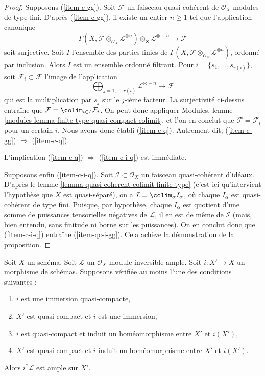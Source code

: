 \begin{proof}
\medskip\noindent
Supposons (\ref{item-c-gg}). Soit $\mathcal{F}$ un faisceau
quasi-cohérent de $\mathcal{O}_X$-modules de type fini.
D'après (\ref{item-c-gg}), il existe un entier $n \geq 1$ tel que
l'application canonique
$$
\Gamma(X, \mathcal{F} \otimes_{\mathcal{O}_X} \mathcal{L}^{\otimes n})
\otimes_{\mathbf{Z}} \mathcal{L}^{\otimes -n}
\longrightarrow
\mathcal{F}
$$
soit surjective. Soit $I$ l'ensemble des parties finies de
$\Gamma(X, \mathcal{F} \otimes_{\mathcal{O}_X} \mathcal{L}^{\otimes n})$,
ordonné par inclusion. Alors $I$ est un ensemble ordonné filtrant.
Pour $i = \{s_1, \ldots, s_{r(i)}\}$, soit $\mathcal{F}_i \subset \mathcal{F}$
l'image de l'application
$$
\bigoplus\nolimits_{j = 1, \ldots, r(i)} \mathcal{L}^{\otimes -n}
\longrightarrow
\mathcal{F}
$$
qui est la multiplication par $s_j$ sur le $j$-ième facteur. La surjectivité
ci-dessus entraîne que $\mathcal{F} = \colim_{i \in I} \mathcal{F}_i$.
On peut donc appliquer Modules, lemme \ref{modules-lemma-finite-type-quasi-compact-colimit},
et l'on en conclut que
$\mathcal{F} = \mathcal{F}_i$ pour un certain $i$.
Nous avons donc établi (\ref{item-c-q}). Autrement dit,
(\ref{item-c-gg}) $\Rightarrow$ (\ref{item-c-q}).

\medskip\noindent
L'implication (\ref{item-c-q}) $\Rightarrow$ (\ref{item-c-i-q}) est immédiate.

\medskip\noindent
Supposons enfin (\ref{item-c-i-q}).
Soit $\mathcal{I} \subset \mathcal{O}_X$ un faisceau quasi-cohérent
d'idéaux. D'après le lemme \ref{lemma-quasi-coherent-colimit-finite-type}
(c'est ici qu'intervient l'hypothèse que $X$ est
quasi-séparé), on a $\mathcal{I} = \colim_\alpha I_\alpha$, où
chaque $I_\alpha$ est quasi-cohérent de type fini. Puisque, par hypothèse,
chaque $I_\alpha$ est quotient d'une somme de puissances tensorielles négatives de
$\mathcal{L}$, il en est de même de $\mathcal{I}$ (mais, bien
entendu, sans finitude ni borne sur les puissances). On en
conclut donc que (\ref{item-c-i-q}) entraîne (\ref{item-qc-i-gg}).
Cela achève la démonstration de la proposition.
\end{proof}

\begin{lemma}
\label{lemma-ample-on-locally-closed}
Soit $X$ un schéma. Soit $\mathcal{L}$ un
$\mathcal{O}_X$-module inversible ample. Soit $i : X' \to X$ un morphisme de schémas.
Supposons vérifiée au moins l'une des conditions suivantes :
\begin{enumerate}
\item $i$ est une immersion quasi-compacte,
\item $X'$ est quasi-compact et $i$ est une immersion,
\item $i$ est quasi-compact et induit un
homéomorphisme entre $X'$ et $i(X')$,
\item $X'$ est quasi-compact et $i$ induit un
homéomorphisme entre $X'$ et $i(X')$.
\end{enumerate}
Alors $i^*\mathcal{L}$ est ample sur $X'$.
\end{lemma}

